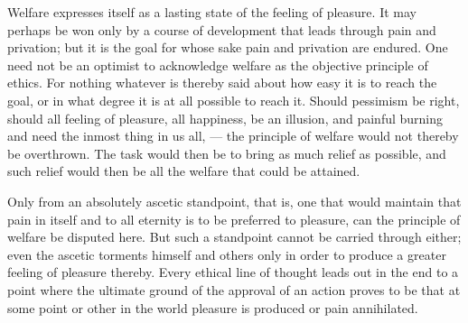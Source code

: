 \documentclass[12pt,a4paper,openany]{book}
\newcommand{\opage}[1]{\marginnote{\footnotesize\textit{[#1]}}}
\begin{document}
Welfare expresses itself as a lasting state of the feeling of pleasure. It may perhaps be won only by a
course of development that leads through pain and privation; but it is the goal for whose sake pain and
privation are endured. One need not be an optimist to acknowledge welfare as the objective principle of
ethics. For nothing whatever is thereby said about how easy it is to reach the goal, or in what degree it
is at all possible to reach it. Should pessimism be right, should all feeling of pleasure, all happiness,
be an illusion, and painful burning and need the inmost thing in us all, --- the principle of welfare
would not thereby be overthrown. The task would then be to bring as much relief as possible, and such
relief would then be all the welfare that could be attained.

Only from an absolutely ascetic standpoint, that is, one that would maintain that pain in itself and to
all eternity is to be preferred to pleasure, can the principle of welfare be disputed here. But such a
standpoint cannot be carried through either; even the ascetic torments himself and others only in order
to produce a greater feeling of pleasure thereby. Every ethical line of thought leads out in the end to a
point where the ultimate ground of the approval of an
\opage{138}action proves to be that at some point or other in the world pleasure is produced or pain annihilated.
\end{document}
